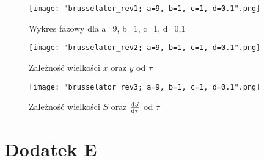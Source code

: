 \documentclass[10pt, a4paper, twoside, onecolumn]{article}
\numberwithin{equation}{section}
\begin{document}
	\begin{figure}[H]
		\centering
		\texttt{[image: "brusselator\_rev1; a=9, b=1, c=1, d=0.1".png]}
		\caption{Wykres fazowy dla a=9, b=1, c=1, d=0,1}
	\end{figure}
	\begin{figure}[H]
		\centering
		\texttt{[image: "brusselator\_rev2; a=9, b=1, c=1, d=0.1".png]}
		\caption{Zależność wielkości \(x\) oraz \(y\) od \(\tau\)}
	\end{figure}
	\begin{figure}[H]
		\centering
		\texttt{[image: "brusselator\_rev3; a=9, b=1, c=1, d=0.1".png]}
		\caption{Zależność wielkości \(S\) oraz \(\dv{S}{\tau}\) od \(\tau\)}
	\end{figure}
	\section{Dodatek E}
	
\end{document}
